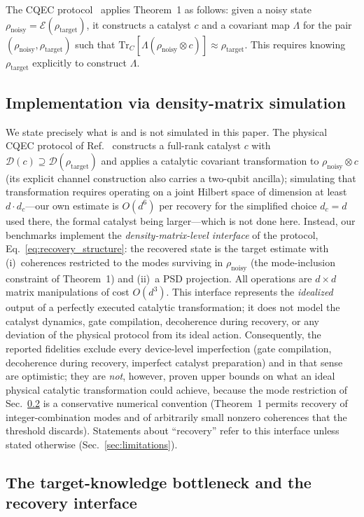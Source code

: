 \documentclass[pra,twocolumn,superscriptaddress,longbibliography,floatfix,nofootinbib]{revtex4-2}
\newcommand{\DD}{\mathcal{D}}
\newcommand{\EE}{\mathcal{E}}
\newcommand{\tr}{\mathrm{Tr}}
\newcommand{\rhot}{\rho_\mathrm{target}}
\newcommand{\rhon}{\rho_\mathrm{noisy}}
\begin{document}
The CQEC protocol~\cite{Wakaura2026unified} applies Theorem~1 as follows: given a noisy state $\rhon = \EE(\rhot)$, it constructs a catalyst $c$ and a covariant map $\Lambda$ for the pair $(\rhon, \rhot)$ such that $\tr_C[\Lambda(\rhon \otimes c)] \approx \rhot$.
This requires knowing $\rhot$ explicitly to construct $\Lambda$.

\subsection{Implementation via density-matrix simulation}
\label{sec:implementation}

We state precisely what is and is not simulated in this paper.
The physical CQEC protocol of Ref.~\cite{Wakaura2026unified} constructs a full-rank catalyst $c$ with $\DD(c) \supseteq \DD(\rhot)$ and applies a catalytic covariant transformation to $\rhon \otimes c$ (its explicit channel construction also carries a two-qubit ancilla); simulating that transformation requires operating on a joint Hilbert space of dimension at least $d \cdot d_c$---our own estimate is $O(d^6)$ per recovery for the simplified choice $d_c = d$ used there, the formal catalyst being larger---which is not done here.
Instead, our benchmarks implement the \emph{density-matrix-level interface} of the protocol, Eq.~\eqref{eq:recovery_structure}: the recovered state is the target estimate with (i)~coherences restricted to the modes surviving in $\rhon$ (the mode-inclusion constraint of Theorem~1) and (ii)~a PSD projection.
All operations are $d \times d$ matrix manipulations of cost $O(d^3)$.
This interface represents the \emph{idealized} output of a perfectly executed catalytic transformation; it does not model the catalyst dynamics, gate compilation, decoherence during recovery, or any deviation of the physical protocol from its ideal action.
Consequently, the reported fidelities exclude every device-level imperfection (gate compilation, decoherence during recovery, imperfect catalyst preparation) and in that sense are optimistic; they are \emph{not}, however, proven upper bounds on what an ideal physical catalytic transformation could achieve, because the mode restriction of Sec.~\ref{sec:bottleneck} is a conservative numerical convention (Theorem~1 permits recovery of integer-combination modes and of arbitrarily small nonzero coherences that the threshold discards). Statements about ``recovery'' refer to this interface unless stated otherwise (Sec.~\ref{sec:limitations}).

\subsection{The target-knowledge bottleneck and the recovery interface}
\label{sec:bottleneck}
\end{document}
